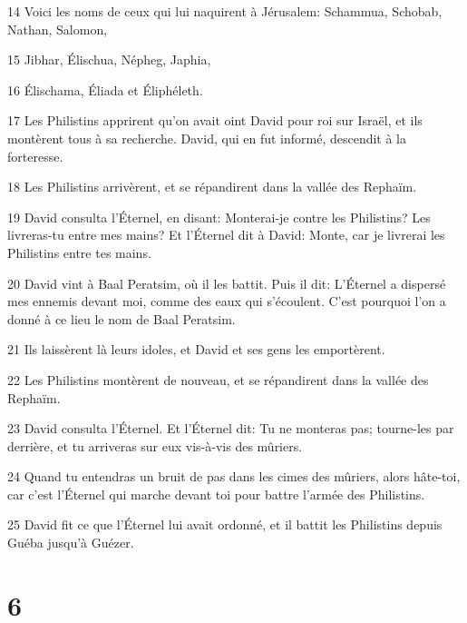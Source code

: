 \par 14 Voici les noms de ceux qui lui naquirent à Jérusalem: Schammua, Schobab, Nathan, Salomon,
\par 15 Jibhar, Élischua, Népheg, Japhia,
\par 16 Élischama, Éliada et Éliphéleth.
\par 17 Les Philistins apprirent qu'on avait oint David pour roi sur Israël, et ils montèrent tous à sa recherche. David, qui en fut informé, descendit à la forteresse.
\par 18 Les Philistins arrivèrent, et se répandirent dans la vallée des Rephaïm.
\par 19 David consulta l'Éternel, en disant: Monterai-je contre les Philistins? Les livreras-tu entre mes mains? Et l'Éternel dit à David: Monte, car je livrerai les Philistins entre tes mains.
\par 20 David vint à Baal Peratsim, où il les battit. Puis il dit: L'Éternel a dispersé mes ennemis devant moi, comme des eaux qui s'écoulent. C'est pourquoi l'on a donné à ce lieu le nom de Baal Peratsim.
\par 21 Ils laissèrent là leurs idoles, et David et ses gens les emportèrent.
\par 22 Les Philistins montèrent de nouveau, et se répandirent dans la vallée des Rephaïm.
\par 23 David consulta l'Éternel. Et l'Éternel dit: Tu ne monteras pas; tourne-les par derrière, et tu arriveras sur eux vis-à-vis des mûriers.
\par 24 Quand tu entendras un bruit de pas dans les cimes des mûriers, alors hâte-toi, car c'est l'Éternel qui marche devant toi pour battre l'armée des Philistins.
\par 25 David fit ce que l'Éternel lui avait ordonné, et il battit les Philistins depuis Guéba jusqu'à Guézer.

\chapter{6}

